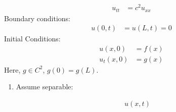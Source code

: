 \documentclass{article}
\begin{document}
\begin{align}
  u_{tt} & = c^2 u_{xx}
\end{align}
Boundary conditions:
\begin{align}
  u(0, t) & = u(L, t) = 0
\end{align}
Initial Conditions:
\begin{align}
  u(x, 0) & = f(x)\\
  u_t(x, 0) & = g(x)
\end{align}
Here, $g \in C^2$, $g(0) = g(L)$.
\begin{enumerate}
  \item Assume separable:

  \begin{align}
    u(x, t)
  \end{align}


\end{enumerate}
\end{document}

